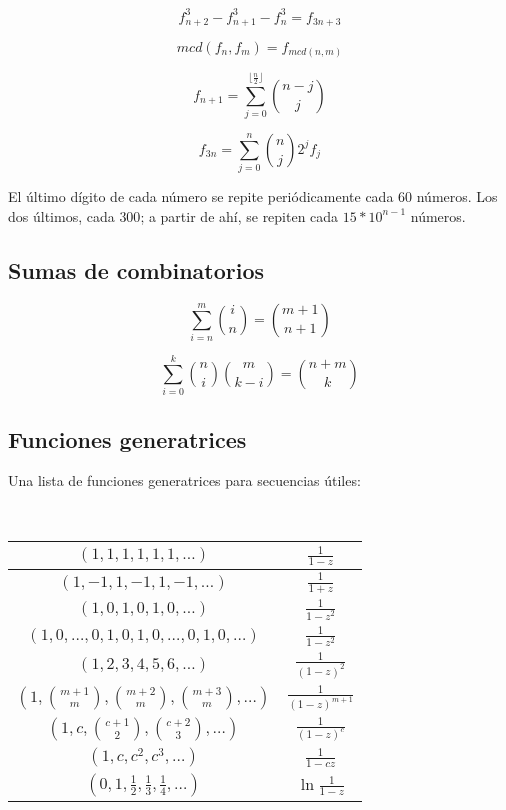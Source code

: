 	\begin{equation*}
		f_{n+2}^3 - f_{n+1}^3 - f_n^3 = f_{3n + 3}
	\end{equation*}
	
	\begin{equation*}
		mcd(f_n, f_m) = f_{mcd(n, m)}
	\end{equation*}
	
	 \begin{equation*}
		 f_{n+1} = \sum_{j = 0}^{\lfloor \frac{n}{2} \rfloor} \binom{n-j}{j}
	 \end{equation*}
	 
	 \begin{equation*}
	 f_{3n} = \sum_{j = 0}^{n} \binom{n}{j} 2^j f_j
	 \end{equation*}
	
	El último dígito de cada número se repite periódicamente cada $60$ números. Los dos últimos, cada $300$; a partir de ahí, se repiten cada $15*10^{n-1}$ números.

    \subsection{Sumas de combinatorios}

    \begin{equation*}
     \sum_{i = n}^m \binom{i}{n} = \binom{m + 1}{n + 1}
    \end{equation*}

    \begin{equation*}
     \sum_{i = 0}^k \binom{n}{i} \binom{m}{k - i} = \binom{n + m}{k}
    \end{equation*}


    \subsection{Funciones generatrices}
      Una lista de funciones generatrices para secuencias útiles:

      \ 

      \begin{tabular}{|c|c|}
        \hline
        $(1,1,1,1,1,1,\ldots)$ & $\frac{1}{1-z}$ \\ \hline
        $(1,-1,1,-1,1,-1,\ldots)$ & $\frac{1}{1+z}$ \\ \hline
        $(1,0,1,0,1,0,\ldots)$ & $\frac{1}{1-z^2}$ \\ \hline
        $(1,0,\ldots,0,1,0,1,0,\ldots,0,1,0,\ldots)$ & $\frac{1}{1-z^2}$ \\ \hline
        $(1,2,3,4,5,6,\ldots)$ & $\frac{1}{(1-z)^2}$ \\ \hline
        $(1,\binom{m+1}{m},\binom{m+2}{m},\binom{m+3}{m},\ldots)$ & $\frac{1}{(1-z)^{m+1}}$ \\ \hline
        $(1,c,\binom{c+1}{2},\binom{c+2}{3},\ldots)$ & $\frac{1}{(1-z)^c}$ \\ \hline
        $(1,c,c^2, c^3, \ldots)$ & $\frac{1}{1-cz}$ \\ \hline
        $(0,1,\frac{1}{2},\frac{1}{3},\frac{1}{4},\ldots)$ & $\ln \frac{1}{1-z}$ \\ \hline
      \end{tabular}

